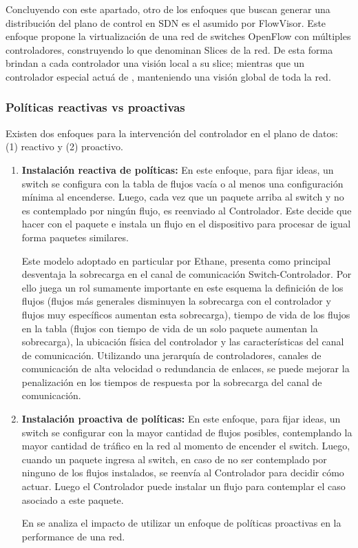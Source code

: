 Concluyendo con este apartado, otro de los enfoques que buscan generar una distribución del plano de control en SDN es el asumido por FlowVisor\cite{sherwood2010carving}. Este enfoque propone la virtualización de una red de switches OpenFlow con múltiples controladores, construyendo lo que denominan Slices de la red. De esta forma brindan a cada controlador una visión local a su slice; mientras que un controlador especial actuá de , manteniendo una visión global de toda la red.

\subsubsection{Políticas reactivas vs proactivas}
Existen dos enfoques para la intervención del controlador en el plano de datos: (1) reactivo y (2) proactivo.

\begin{enumerate}
\item \textbf{Instalación reactiva de políticas:} En este enfoque, para fijar ideas, un switch se configura con la tabla de flujos vac\'ia o al menos una configuración mínima al encenderse. Luego, cada vez que un paquete arriba al switch y no es contemplado por ning\'un flujo, es reenviado al Controlador. Este decide que hacer con el paquete e instala un flujo en el dispositivo para procesar de igual forma paquetes similares.

Este modelo adoptado en particular por Ethane\cite{casado2007ethane}, presenta como principal desventaja la sobrecarga en el canal de comunicación Switch-Controlador. Por ello juega un rol sumamente importante en este esquema la definición de los flujos (flujos m\'as generales disminuyen la sobrecarga con el controlador y flujos muy específicos aumentan esta sobrecarga), tiempo de vida de los flujos en la tabla (flujos con tiempo de vida de un solo paquete aumentan la sobrecarga), la ubicación física del controlador y las características del canal de comunicación. Utilizando una jerarquía de controladores, canales de comunicación de alta velocidad o redundancia de enlaces, se puede mejorar la penalizaci\'on en los tiempos de respuesta por la sobrecarga del canal de comunicación. 

\item \textbf{Instalación proactiva de políticas:} En este enfoque, para fijar ideas, un switch se configurar con la mayor cantidad de flujos posibles, contemplando la mayor cantidad de tr\'afico en la red al momento de encender el switch. Luego, cuando un paquete ingresa al switch, en caso de no ser contemplado por ninguno de los flujos instalados, se reenvía al Controlador para decidir c\'omo actuar. Luego el Controlador puede instalar un flujo para contemplar el caso asociado a este paquete. 

En \cite{yu2011scalable} se analiza el impacto de utilizar un enfoque de políticas proactivas en la performance de una red.  

\end{enumerate} 

